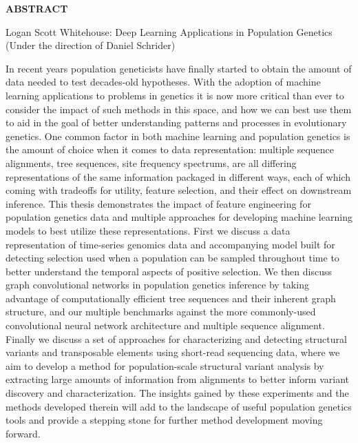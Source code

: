\begin{center}
\vspace*{52pt}
{\normalfont\textbf{ABSTRACT}}
\vspace{11pt}

\begin{singlespace}
Logan Scott Whitehouse: Deep Learning Applications in Population Genetics \\
(Under the direction of Daniel Schrider)
\end{singlespace}
\end{center}
In recent years population geneticists have finally started to obtain the amount of data needed to test decades-old hypotheses. With the adoption of machine learning applications to problems in genetics it is now more critical than ever to consider the impact of such methods in this space, and how we can best use them to aid in the goal of better understanding patterns and processes in evolutionary genetics. One common factor in both machine learning and population genetics is the amount of choice when it comes to data representation: multiple sequence alignments, tree sequences, site frequency spectrums, are all differing representations of the same information packaged in different ways, each of which coming with tradeoffs for utility, feature selection, and their effect on downstream inference. This thesis demonstrates the impact of feature engineering for population genetics data and multiple approaches for developing machine learning models to best utilize these representations. First we discuss a data representation of time-series genomics data and accompanying model built for detecting selection used when a population can be sampled throughout time to better understand the temporal aspects of positive selection. We then discuss graph convolutional networks in population genetics inference by taking advantage of computationally efficient tree sequences and their inherent graph structure, and our multiple benchmarks against the more commonly-used convolutional neural network architecture and multiple sequence alignment. Finally we discuss a set of approaches for characterizing and detecting structural variants and transposable elements using short-read sequencing data, where we aim to develop a method for population-scale structural variant analysis by extracting large amounts of information from alignments to better inform variant discovery and characterization. The insights gained by these experiments and the methods developed therein will add to the landscape of useful population genetics tools and provide a stepping stone for further method development moving forward. 
\clearpage
